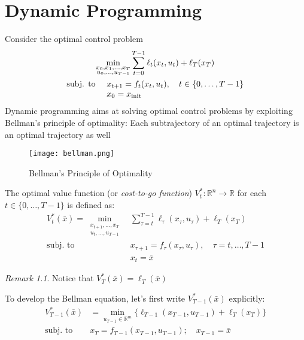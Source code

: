 \documentclass[openany]{book}
\newcommand{\R}{\mathbb{R}}               %
\theoremstyle{definition}
\theoremstyle{remark}
\newtheorem*{remark}{Remark}
\begin{document}
\chapter{Dynamic Programming}
Consider the optimal control problem 
\begin{gather*}
    \min_{\substack{x_0,x_1,\dots,x_T\\u_0,\dots,u_{T-1}}} \displaystyle\sum_{t=0}^{T-1}\ell_t(x_t,u_t)+\ell_T(x_T)\\
    \begin{array}{l l }
        \text{subj. to } & x_{t+1}=f_t(x_t,u_t), \quad t\in\{0,\dots,T-1\}\\
                         & x_0 = x_{\text{init}}
    \end{array}
\end{gather*}
Dynamic programming aims at solving optimal control problems by exploiting Bellman's principle of optimality: Each subtrajectory of an optimal trajectory is an optimal trajectory as well

\begin{figure}[ht]
    \centering
    \texttt{[image: bellman.png]}
    \caption{Bellman's Principle of Optimality}
    \label{fig:bellman}
\end{figure}


The optimal value function (or \emph{cost-to-go function}) $V_t^*:\R^n \to \R$ for each $t \in \{0,\dots,T-1\}$ is defined as:
\begin{align*}
    V_t^*(\bar{x})=  \min_{\substack{x_{t+1},\dots,x_T\\u_t,\dots,u_{T-1}}} &  \displaystyle\sum_{\tau=t}^{T-1}\ell_\tau(x_\tau,u_\tau)+\ell_T(x_T)\\
                            \text{subj. to } & x_{\tau+1}=f_\tau(x_\tau,u_\tau), \quad \tau = t,\dots,T-1\\
                                             & x_t = \bar{x}
\end{align*}

\begin{remark}
Notice that $V_T^*(\bar{x})=\ell_T(\bar{x})$
\end{remark}

To develop the Bellman equation, let's first write $V_{T-1}^*(\bar{x})$ explicitly:
\begin{align*}
    V_{T-1}^*(\bar{x}) &= \min_{u_{T-1}\in\R^m} \{\ell_{T-1}(x_{T-1},u_{T-1}) + \ell_T(x_T)\} \\
    \text{subj. to } & x_T = f_{T-1}(x_{T-1},u_{T-1}); \quad x_{T-1} = \bar{x}
\end{align*}
\end{document}
